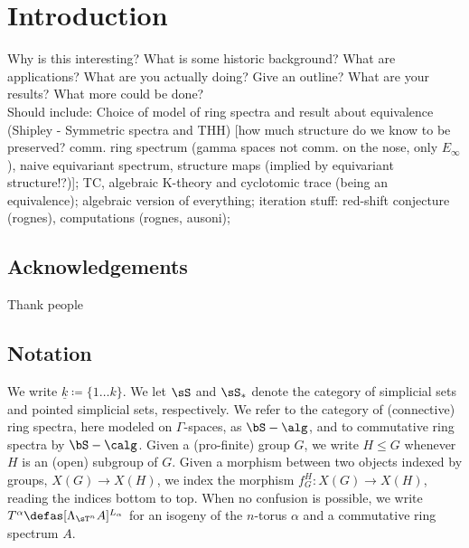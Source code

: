 \section{Introduction}
  Why is this interesting? What is some historic background? What are applications? What are you actually doing? Give an outline? What are your results? What more could be done?\\
  Should include: Choice of model of ring spectra and result about equivalence (Shipley - Symmetric spectra and THH) [how much structure do we know to be preserved? comm. ring spectrum (gamma spaces not comm. on the nose, only $E_\infty$), naive equivariant spectrum, structure maps (implied by equivariant structure!?)]; TC, algebraic K-theory and cyclotomic trace (being an equivalence); algebraic version of everything; iteration stuff: red-shift conjecture (rognes), computations (rognes, ausoni);
  \subsection{Acknowledgements}
    Thank people %
  \subsection{Notation}
    We write $\underline{k} \coloneqq \{1 \ldots k \}$. We let $\sS$ and $\sS_*$ denote the category of simplicial sets and pointed simplicial sets, respectively. We refer to the category of (connective) ring spectra, here modeled on $\Gamma$-spaces, as $\bS-\alg$, and to commutative ring spectra by $\bS-\calg$. Given a (pro-finite) group $G$, we write $H \leq G$ whenever $H$ is an (open) subgroup of $G$. Given a morphism between two objects indexed by groups, $X(G) \to X(H)$, we index the morphism $f_G^H: X(G) \to X(H)$, reading the indices bottom to top. When no confusion is possible, we write $T^\alpha \defas [\Lambda_{\sT^n} A]^{L_\alpha}$ for an isogeny of the $n$-torus $\alpha$ and a commutative ring spectrum $A$.
